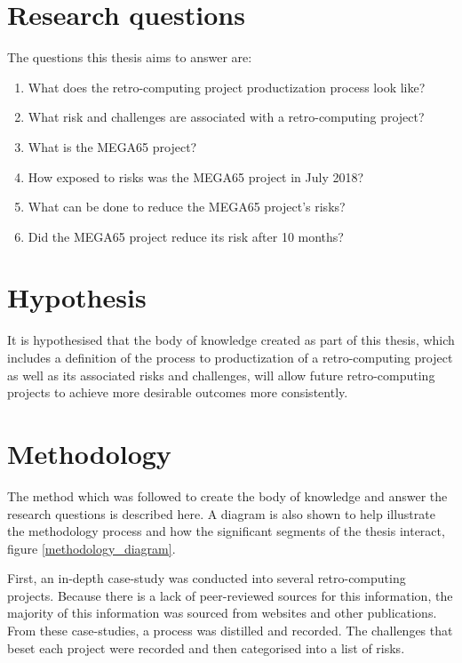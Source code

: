 \section{Research questions}
The questions this thesis aims to answer are:
\begin{enumerate}
\item What does the retro-computing project productization process look like?
\item What risk and challenges are associated with a retro-computing project?
\item What is the MEGA65 project? 
\item How exposed to risks was the MEGA65 project in July 2018?
\item What can be done to reduce the MEGA65 project's risks?
\item Did the MEGA65 project reduce its risk after 10 months?
\end{enumerate}

\section{Hypothesis}
\label{hypothesis}
It is hypothesised that the body of knowledge created as part of this thesis, which includes a definition of the process to productization of a retro-computing project as well as its associated risks and challenges, will allow future retro-computing projects to achieve more desirable outcomes more consistently.

\section{Methodology}
The method which was followed to create the body of knowledge and answer the research questions is described here. A diagram is also shown to help illustrate the methodology process and how the significant segments of the thesis interact, figure \ref{methodology_diagram}.

First, an in-depth case-study was conducted into several retro-computing projects. Because there is a lack of peer-reviewed sources for this information, the majority of this information was sourced from websites and other publications. From these case-studies, a process was distilled and recorded. The challenges that beset each project were recorded and then categorised into a list of risks. 

